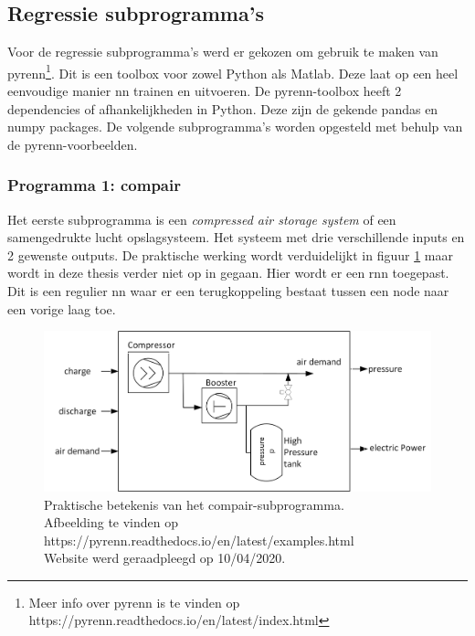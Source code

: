 	\subsection{Regressie subprogramma's}
	Voor de regressie subprogramma's werd er gekozen om gebruik te maken van pyrenn\footnote{Meer info over pyrenn is te vinden op https://pyrenn.readthedocs.io/en/latest/index.html}. Dit is een toolbox voor zowel Python als Matlab. Deze laat op een heel eenvoudige manier \gls{nn} trainen en uitvoeren. De pyrenn-toolbox heeft 2 dependencies of afhankelijkheden in Python. Deze zijn de gekende pandas en numpy packages.  De volgende subprogramma's worden opgesteld met behulp van de pyrenn-voorbeelden. 

		\subsubsection{Programma 1: compair}
		Het eerste subprogramma is een \textit{compressed air storage system} of een samengedrukte lucht opslagsysteem. Het systeem met drie verschillende inputs en 2 gewenste outputs. De praktische werking wordt verduidelijkt in figuur \ref{fig:compairPraktijk} maar wordt in deze thesis verder niet op in gegaan. Hier wordt er een \gls{rnn} toegepast. Dit is een regulier \gls{nn} waar er een terugkoppeling bestaat tussen een node naar een vorige laag toe. 
			
		\begin{figure}
			\centering
			\includegraphics[width=120mm]{afbeeldingen/compairPraktijk.PNG}
			\caption{Praktische betekenis van het compair-subprogramma. \\Afbeelding te vinden op https://pyrenn.readthedocs.io/en/latest/examples.html\\ Website werd geraadpleegd op 10/04/2020.}
			\label{fig:compairPraktijk}
		\end{figure}
	
